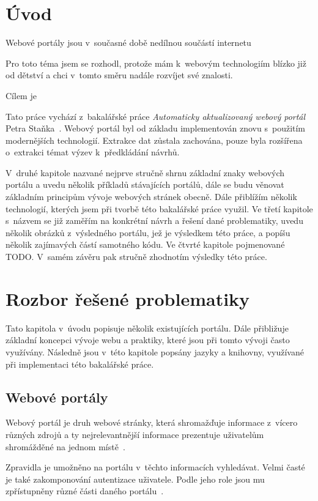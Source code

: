 \chapter{Úvod}
Webové portály jsou v~současné době nedílnou součástí internetu \blindtext

Pro toto téma jsem se rozhodl, protože mám k~webovým technologiím blízko již od dětství a chci v~tomto směru nadále rozvíjet své znalosti.

Cílem je \blindtext

Tato práce vychází z~bakalářské práce \emph{Automaticky aktualizovaný webový portál} Petra Staňka~\cite{bib:stanek}.
Webový portál byl od základu implementován znovu s~použitím modernějších technologií. Extrakce dat zůstala zachována, pouze byla rozšířena o~extrakci témat výzev k~předkládání návrhů.

V~druhé kapitole nazvané  nejprve stručně shrnu základní znaky webových portálu a uvedu několik příkladů stávajících portálů, dále se budu věnovat základním principům vývoje webových stránek obecně. Dále přiblížím několik technologií, kterých jsem při tvorbě této bakalářské práce využil.
Ve třetí kapitole s~názvem  se již zaměřím na konkrétní návrh a řešení dané problematiky, uvedu několik obrázků z~výsledného portálu, jež je výsledkem této práce, a popíšu několik zajímavých částí samotného kódu.
Ve čtvrté kapitole pojmenované  TODO. V~samém závěru pak stručně zhodnotím výsledky této práce.




\chapter{Rozbor řešené problematiky}
Tato kapitola v~úvodu popisuje několik existujících portálu. Dále přibližuje základní koncepci vývoje webu a praktiky, které jsou při tomto vývoji často využívány. Následně jsou v~této kapitole popsány jazyky a knihovny, využívané při implementaci této bakalářské práce.

\section{Webové portály}
Webový portál je druh webové stránky, která shromažďuje informace z~vícero různých zdrojů a ty nejrelevantnější informace prezentuje uživatelům shromážděné na jednom místě~\cite{bib:portal-liferay}.

Zpravidla je umožněno na portálu v~těchto informacích vyhledávat. Velmi časté je také zakomponování autentizace uživatele. Podle jeho role jsou mu zpřístupněny různé části daného portálu~\cite{bib:portal-indiana}.

